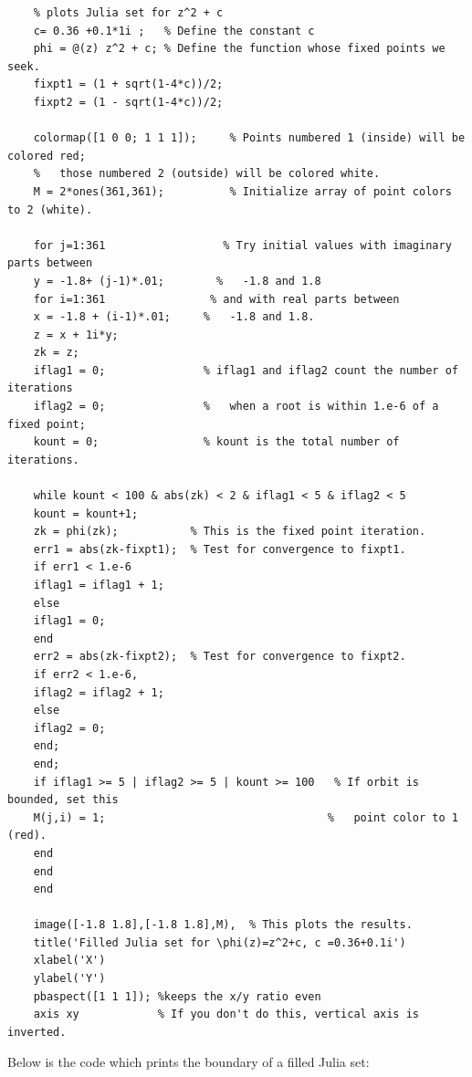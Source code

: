 \documentclass[12pt]{article}
\begin{document}
	\begin{verbatim}
	% plots Julia set for z^2 + c
	c= 0.36 +0.1*1i ;   % Define the constant c
	phi = @(z) z^2 + c; % Define the function whose fixed points we seek.
	fixpt1 = (1 + sqrt(1-4*c))/2;
	fixpt2 = (1 - sqrt(1-4*c))/2;
	
	colormap([1 0 0; 1 1 1]);     % Points numbered 1 (inside) will be colored red;
	%   those numbered 2 (outside) will be colored white.
	M = 2*ones(361,361);          % Initialize array of point colors to 2 (white).
	
	for j=1:361                  % Try initial values with imaginary parts between
	y = -1.8+ (j-1)*.01;        %   -1.8 and 1.8
	for i=1:361                % and with real parts between
	x = -1.8 + (i-1)*.01;     %   -1.8 and 1.8.
	z = x + 1i*y;             
	zk = z;
	iflag1 = 0;               % iflag1 and iflag2 count the number of iterations
	iflag2 = 0;               %   when a root is within 1.e-6 of a fixed point;
	kount = 0;                % kount is the total number of iterations.
	
	while kount < 100 & abs(zk) < 2 & iflag1 < 5 & iflag2 < 5
	kount = kount+1;
	zk = phi(zk);           % This is the fixed point iteration.
	err1 = abs(zk-fixpt1);  % Test for convergence to fixpt1.
	if err1 < 1.e-6
	iflag1 = iflag1 + 1;
	else
	iflag1 = 0;
	end
	err2 = abs(zk-fixpt2);  % Test for convergence to fixpt2.
	if err2 < 1.e-6,
	iflag2 = iflag2 + 1;
	else
	iflag2 = 0;
	end;
	end;
	if iflag1 >= 5 | iflag2 >= 5 | kount >= 100   % If orbit is bounded, set this
	M(j,i) = 1;                                  %   point color to 1 (red).
	end
	end
	end
	
	image([-1.8 1.8],[-1.8 1.8],M),  % This plots the results.
	title('Filled Julia set for \phi(z)=z^2+c, c =0.36+0.1i')
	xlabel('X')
	ylabel('Y')
	pbaspect([1 1 1]); %keeps the x/y ratio even
	axis xy            % If you don't do this, vertical axis is inverted.
	\end{verbatim}
	
	\noindent Below is the code which prints the boundary of a filled Julia set: \\
\end{document}
